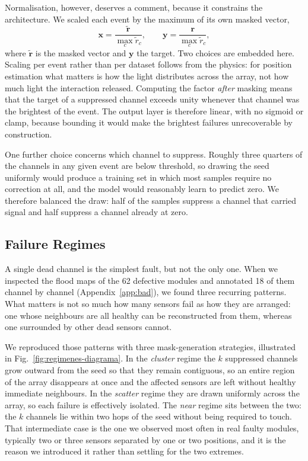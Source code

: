 \documentclass[10pt,conference]{IEEEtran}
\begin{document}
Normalisation, however, deserves a comment, because it constrains the
architecture. We scaled each event by the maximum of its own masked vector,
%
\begin{equation}
\mathbf{x} = \frac{\tilde{\mathbf{r}}}{\max_{c} \tilde{r}_{c}},
\qquad
\mathbf{y} = \frac{\mathbf{r}}{\max_{c} \tilde{r}_{c}},
\label{eq:norm}
\end{equation}
%
where $\tilde{\mathbf{r}}$ is the masked vector and $\mathbf{y}$ the target.
Two choices are embedded here. Scaling per event rather than per dataset
follows from the physics: for position estimation what matters is how the light
distributes across the array, not how much light the interaction released.
Computing the factor \emph{after} masking means that the target of a suppressed
channel exceeds unity whenever that channel was the brightest of the event.
The output layer is therefore linear, with no sigmoid or clamp, because
bounding it would make the brightest failures unrecoverable by construction.

One further choice concerns which channel to suppress. Roughly three quarters
of the channels in any given event are below threshold, so drawing the seed
uniformly would produce a training set in which most samples require no
correction at all, and the model would reasonably learn to predict zero. We
therefore balanced the draw: half of the samples suppress a channel that
carried signal and half suppress a channel already at zero.

\subsection{Failure Regimes}
\label{sec:regimes}

A single dead channel is the simplest fault, but not the only one. When we
inspected the flood maps of the 62 defective modules and annotated 18 of them
channel by channel (Appendix~\ref{app:bad}), we found three recurring
patterns. What matters is not so much how many sensors fail as how they are
arranged: one whose neighbours are all healthy can be reconstructed from them,
whereas one surrounded by other dead sensors cannot.

We reproduced those patterns with three mask-generation strategies, illustrated
in Fig.~\ref{fig:regimenes-diagrama}. In the \emph{cluster} regime the $k$
suppressed channels grow outward from the seed so that they remain contiguous,
so an entire region of the array disappears at once and the affected sensors
are left without healthy immediate neighbours. In the \emph{scatter} regime
they are drawn uniformly across the array, so each failure is effectively
isolated. The \emph{near} regime sits between the two: the $k$ channels lie
within two hops of the seed without being required to touch. That intermediate case is the one we observed most often in real faulty
modules, typically two or three sensors separated by one or two positions, and
it is the reason we introduced it rather than settling for the two extremes.
\end{document}
